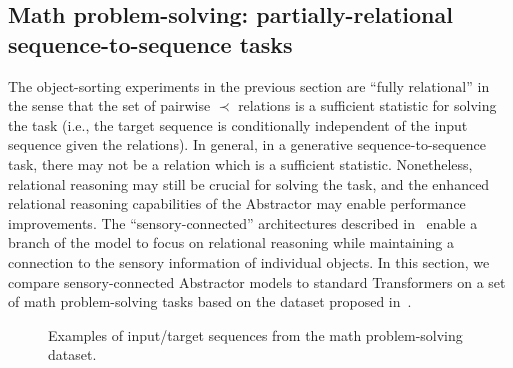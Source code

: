 \subsection{Math problem-solving: partially-relational sequence-to-sequence tasks}\label{ssec:experiments_math}

The object-sorting experiments in the previous section are ``fully relational'' in the sense that the set of pairwise $\prec$ relations is a sufficient statistic for solving the task (i.e., the target sequence is conditionally independent of the input sequence given the relations). In general, in a generative sequence-to-sequence task, there may not be a relation which is a sufficient statistic. Nonetheless, relational reasoning may still be crucial for solving the task, and the enhanced relational reasoning capabilities of the Abstractor may enable performance improvements. The ``sensory-connected'' architectures described in~ enable a branch of the model to focus on relational reasoning while maintaining a connection to the sensory information of individual objects. In this section, we compare sensory-connected Abstractor models to standard Transformers on a set of math problem-solving tasks based on the dataset proposed in~\citep{saxtonAnalyzingMathematicalReasoning2019}.

\begin{figure}
    \begin{center}
    \end{center}
\caption{Examples of input/target sequences from the math problem-solving dataset.}\label{fig:math_dataset}
\end{figure}

